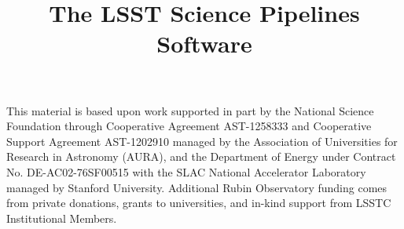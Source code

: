 \documentclass[twocolumn]{aastex631}
\begin{document}
\title{The LSST Science Pipelines Software}





















\begin{acknowledgments}
This material is based upon work supported in part by the National Science Foundation through Cooperative Agreement AST-1258333 and Cooperative Support Agreement AST-1202910 managed by the Association of Universities for Research in Astronomy (AURA), and the Department of Energy under Contract No. DE-AC02-76SF00515 with the SLAC National Accelerator Laboratory managed by Stanford University.
Additional Rubin Observatory funding comes from private donations, grants to universities, and in-kind support from LSSTC Institutional Members.
\end{acknowledgments}



\end{document}

